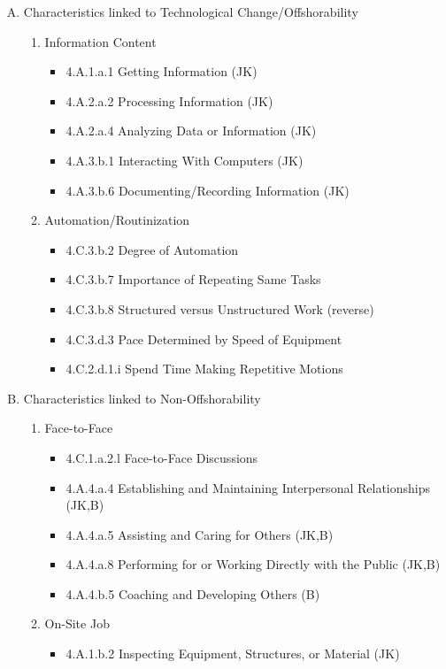 \begin{enumerate}[A.]
\item Characteristics linked to Technological Change/Offshorability
\begin{enumerate}[1.]
\item Information Content 
  \begin{itemize}
  \item 4.A.1.a.1 Getting Information (JK)
  \item 4.A.2.a.2 Processing Information (JK) 
  \item 4.A.2.a.4 Analyzing Data or Information (JK) 
  \item 4.A.3.b.1 Interacting With Computers (JK) 
  \item 4.A.3.b.6 Documenting/Recording Information (JK)
  \end{itemize}
\item Automation/Routinization 
  \begin{itemize}
  \item 4.C.3.b.2 Degree of Automation 
  \item 4.C.3.b.7 Importance of Repeating Same Tasks 
  \item 4.C.3.b.8 Structured versus Unstructured Work (reverse) 
  \item 4.C.3.d.3 Pace Determined by Speed of Equipment 
  \item 4.C.2.d.1.i Spend Time Making Repetitive Motions
  \end{itemize}
\end{enumerate}
\item Characteristics linked to Non-Offshorability 
\begin{enumerate}[1.]
\item Face-to-Face
\begin{itemize}
  \item 4.C.1.a.2.l Face-to-Face Discussions 
  \item 4.A.4.a.4 Establishing and Maintaining Interpersonal Relationships (JK,B)
  \item 4.A.4.a.5 Assisting and Caring for Others (JK,B) 
  \item 4.A.4.a.8 Performing for or Working Directly with the Public (JK,B) 
  \item 4.A.4.b.5 Coaching and Developing Others (B)
\end{itemize}
\item On-Site Job 
\begin{itemize}
  \item 4.A.1.b.2 Inspecting Equipment, Structures, or Material (JK) 

\end{itemize}
\end{enumerate}
\end{enumerate}
